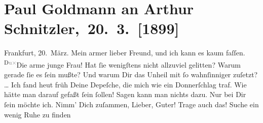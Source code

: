 

         
         \renewcommand{\erwaehntePersonen}{Personen: Marie Reinhard, Olga Waissnix}
         \renewcommand{\erwaehnteOrte}{Orte: Berlin, Frankfurt am Main, Steiermark, Wien}
         \renewcommand{\erwaehnteWerke}{}
               \section[ Paul Goldmann an Arthur Schnitzler, 20. 3. {[}1899{]}]{ Paul Goldmann an Arthur Schnitzler, 20. 3. {[}1899{]}}\nopagebreak{}\rehead{ }\begin{ledgroupsized}[t]{13cm}\normalsize\beginnumbering \toendnotes[C]{\smallbreak\pagebreak[2]} 
\toendnotes[C]{\smallbreak}\pstart
           \raggedleft{}{\pb}Frankfurt, 20. März.\pend
           \pstart{}Mein armer lieber Freund,\pend\pstart
           \label{K_L02870-1v}\label{K_L02870-1h} und ich kann es kaum faſſen. \substVorne{}\textsuperscript{D\textcolor{gray}{u}\textcolor{gray}{×}}\substDazwischen{}Die\substHinten{} arme junge Frau! Hat
               ſie wenigſtens nicht allzuviel gelitten? Warum gerade ſie es ſein mußte? Und warum
               Dir das Unheil mit ſo wahnſinniger \label{K_L02870-2v}\label{K_L02870-2h} zuſetzt? {\dots} Ich fand heut{ }früh Deine Depeſche, die mich wie ein Donnerſchlag traf. Wie hätte man
               darauf gefaßt ſein ſollen! Sagen kann man nichts dazu. Nur bei Dir ſein möchte ich.
               Nimm’ Dich zuſammen, Lieber, Guter! Trage auch das! Suche ein wenig Ruhe zu finden

\end{ledgroupsized}
